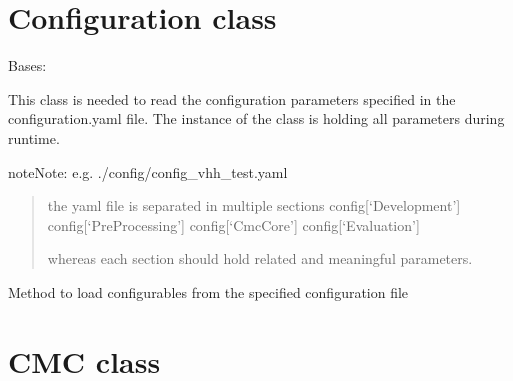 \documentclass[letterpaper,10pt,english]{sphinxmanual}
\begin{document}
\section{Configuration class}
\label{\detokenize{Configuration:configuration-class}}\label{\detokenize{Configuration::doc}}

\begin{fulllineitems}
\label{\detokenize{Configuration:cmc.Configuration.Configuration}}
Bases: 

This class is needed to read the configuration parameters specified in the configuration.yaml file.
The instance of the class is holding all parameters during runtime.

\begin{sphinxadmonition}{note}{Note:}
e.g. ./config/config\_vhh\_test.yaml
\begin{quote}

the yaml file is separated in multiple sections
config{[}‘Development’{]}
config{[}‘PreProcessing’{]}
config{[}‘CmcCore’{]}
config{[}‘Evaluation’{]}

whereas each section should hold related and meaningful parameters.
\end{quote}
\end{sphinxadmonition}

\begin{fulllineitems}
\label{\detokenize{Configuration:cmc.Configuration.Configuration.loadConfig}}
Method to load configurables from the specified configuration file

\end{fulllineitems}


\end{fulllineitems}



\section{CMC class}
\label{\detokenize{CMC:cmc-class}}\label{\detokenize{CMC::doc}}
\end{document}
